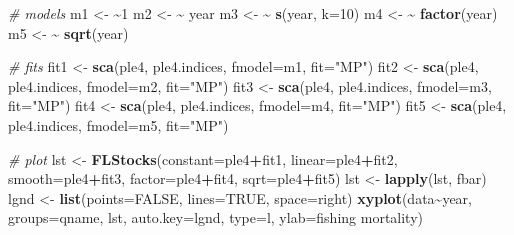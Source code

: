 \documentclass[
]{book}
\newenvironment{Shaded}{\begin{snugshade}}{\end{snugshade}}
\newcommand{\AttributeTok}[1]{\textcolor[rgb]{0.13,0.29,0.53}{#1}}
\newcommand{\CommentTok}[1]{\textcolor[rgb]{0.56,0.35,0.01}{\textit{#1}}}
\newcommand{\ConstantTok}[1]{\textcolor[rgb]{0.56,0.35,0.01}{#1}}
\newcommand{\DecValTok}[1]{\textcolor[rgb]{0.00,0.00,0.81}{#1}}
\newcommand{\ErrorTok}[1]{\textcolor[rgb]{0.64,0.00,0.00}{\textbf{#1}}}
\newcommand{\FunctionTok}[1]{\textcolor[rgb]{0.13,0.29,0.53}{\textbf{#1}}}
\newcommand{\NormalTok}[1]{#1}
\newcommand{\OtherTok}[1]{\textcolor[rgb]{0.56,0.35,0.01}{#1}}
\newcommand{\SpecialCharTok}[1]{\textcolor[rgb]{0.81,0.36,0.00}{\textbf{#1}}}
\newcommand{\StringTok}[1]{\textcolor[rgb]{0.31,0.60,0.02}{#1}}
\begin{document}
\begin{Shaded}
\begin{Highlighting}[]
\CommentTok{\# models}
\NormalTok{m1 }\OtherTok{\textless{}{-}} \ErrorTok{\textasciitilde{}}\DecValTok{1}
\NormalTok{m2 }\OtherTok{\textless{}{-}} \ErrorTok{\textasciitilde{}}\NormalTok{ year}
\NormalTok{m3 }\OtherTok{\textless{}{-}} \ErrorTok{\textasciitilde{}} \FunctionTok{s}\NormalTok{(year, }\AttributeTok{k=}\DecValTok{10}\NormalTok{)}
\NormalTok{m4 }\OtherTok{\textless{}{-}} \ErrorTok{\textasciitilde{}} \FunctionTok{factor}\NormalTok{(year)}
\NormalTok{m5 }\OtherTok{\textless{}{-}} \ErrorTok{\textasciitilde{}} \FunctionTok{sqrt}\NormalTok{(year)}

\CommentTok{\# fits}
\NormalTok{fit1 }\OtherTok{\textless{}{-}} \FunctionTok{sca}\NormalTok{(ple4, ple4.indices, }\AttributeTok{fmodel=}\NormalTok{m1, }\AttributeTok{fit=}\StringTok{"MP"}\NormalTok{)}
\NormalTok{fit2 }\OtherTok{\textless{}{-}} \FunctionTok{sca}\NormalTok{(ple4, ple4.indices, }\AttributeTok{fmodel=}\NormalTok{m2, }\AttributeTok{fit=}\StringTok{"MP"}\NormalTok{)}
\NormalTok{fit3 }\OtherTok{\textless{}{-}} \FunctionTok{sca}\NormalTok{(ple4, ple4.indices, }\AttributeTok{fmodel=}\NormalTok{m3, }\AttributeTok{fit=}\StringTok{"MP"}\NormalTok{)}
\NormalTok{fit4 }\OtherTok{\textless{}{-}} \FunctionTok{sca}\NormalTok{(ple4, ple4.indices, }\AttributeTok{fmodel=}\NormalTok{m4, }\AttributeTok{fit=}\StringTok{"MP"}\NormalTok{)}
\NormalTok{fit5 }\OtherTok{\textless{}{-}} \FunctionTok{sca}\NormalTok{(ple4, ple4.indices, }\AttributeTok{fmodel=}\NormalTok{m5, }\AttributeTok{fit=}\StringTok{"MP"}\NormalTok{)}

\CommentTok{\# plot}
\NormalTok{lst }\OtherTok{\textless{}{-}} \FunctionTok{FLStocks}\NormalTok{(}\AttributeTok{constant=}\NormalTok{ple4}\SpecialCharTok{+}\NormalTok{fit1,}
  \AttributeTok{linear=}\NormalTok{ple4}\SpecialCharTok{+}\NormalTok{fit2,}
  \AttributeTok{smooth=}\NormalTok{ple4}\SpecialCharTok{+}\NormalTok{fit3,}
  \AttributeTok{factor=}\NormalTok{ple4}\SpecialCharTok{+}\NormalTok{fit4,}
  \AttributeTok{sqrt=}\NormalTok{ple4}\SpecialCharTok{+}\NormalTok{fit5)}
\NormalTok{lst }\OtherTok{\textless{}{-}} \FunctionTok{lapply}\NormalTok{(lst, fbar)}
\NormalTok{lgnd }\OtherTok{\textless{}{-}} \FunctionTok{list}\NormalTok{(}\AttributeTok{points=}\ConstantTok{FALSE}\NormalTok{, }\AttributeTok{lines=}\ConstantTok{TRUE}\NormalTok{, }\AttributeTok{space=}\StringTok{\textquotesingle{}right\textquotesingle{}}\NormalTok{)}
\FunctionTok{xyplot}\NormalTok{(data}\SpecialCharTok{\textasciitilde{}}\NormalTok{year, }\AttributeTok{groups=}\NormalTok{qname, lst, }\AttributeTok{auto.key=}\NormalTok{lgnd, }\AttributeTok{type=}\StringTok{\textquotesingle{}l\textquotesingle{}}\NormalTok{, }\AttributeTok{ylab=}\StringTok{\textquotesingle{}fishing mortality\textquotesingle{}}\NormalTok{)}
\end{Highlighting}
\end{Shaded}
\end{document}
